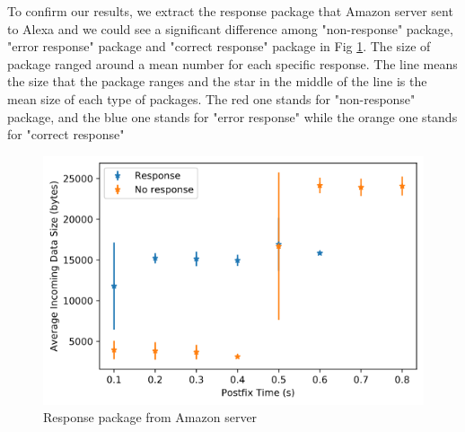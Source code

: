 To confirm our results, we extract the response package that Amazon server sent to Alexa and we could see a significant difference among "non-response" package, "error response" package and "correct response" package in Fig \ref{fig:response_package}. The size of package ranged around a mean number for each specific response. The line means the size that the package ranges and the star in the middle of the line is the mean size of each type of packages. The red one stands for "non-response" package, and the blue one stands for "error response" while the orange one stands for "correct response" 

\begin{figure}[ht]
	\centering
\includegraphics[scale=0.4]{extra_filtered_incoming_data_size}
	\caption{Response package from Amazon server}
	\label{fig:response_package}
	\vspace{-3mm}
	\end{figure}


